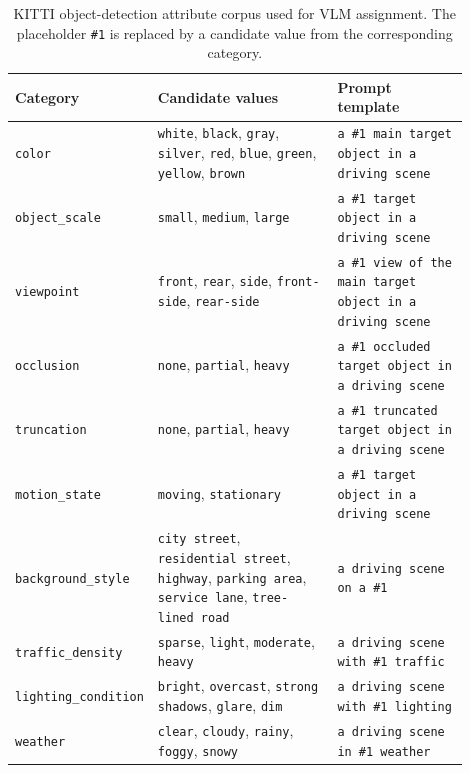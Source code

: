 \documentclass{article}
\begin{document}
\begin{table}[h]
\centering
\caption{KITTI object-detection attribute corpus used for VLM assignment. The placeholder \texttt{\#1} is replaced by a candidate value from the corresponding category.}
\label{tab:kitti-attribute-corpus}
\scriptsize
\setlength{\tabcolsep}{2.5pt}
\renewcommand{\arraystretch}{1.08}
\begin{tabular}{p{0.16\linewidth} p{0.43\linewidth} p{0.31\linewidth}}
\toprule
Category & Candidate values & Prompt template \\
\midrule
\texttt{color} &
\texttt{white}, \texttt{black}, \texttt{gray}, \texttt{silver}, \texttt{red}, \texttt{blue}, \texttt{green}, \texttt{yellow}, \texttt{brown} &
\texttt{a \#1 main target object in a driving scene} \\
\texttt{object\_scale} &
\texttt{small}, \texttt{medium}, \texttt{large} &
\texttt{a \#1 target object in a driving scene} \\
\texttt{viewpoint} &
\texttt{front}, \texttt{rear}, \texttt{side}, \texttt{front-side}, \texttt{rear-side} &
\texttt{a \#1 view of the main target object in a driving scene} \\
\texttt{occlusion} &
\texttt{none}, \texttt{partial}, \texttt{heavy} &
\texttt{a \#1 occluded target object in a driving scene} \\
\texttt{truncation} &
\texttt{none}, \texttt{partial}, \texttt{heavy} &
\texttt{a \#1 truncated target object in a driving scene} \\
\texttt{motion\_state} &
\texttt{moving}, \texttt{stationary} &
\texttt{a \#1 target object in a driving scene} \\
\texttt{background\_style} &
\texttt{city street}, \texttt{residential street}, \texttt{highway}, \texttt{parking area}, \texttt{service lane}, \texttt{tree-lined road} &
\texttt{a driving scene on a \#1} \\
\texttt{traffic\_density} &
\texttt{sparse}, \texttt{light}, \texttt{moderate}, \texttt{heavy} &
\texttt{a driving scene with \#1 traffic} \\
\texttt{lighting\_condition} &
\texttt{bright}, \texttt{overcast}, \texttt{strong shadows}, \texttt{glare}, \texttt{dim} &
\texttt{a driving scene with \#1 lighting} \\
\texttt{weather} &
\texttt{clear}, \texttt{cloudy}, \texttt{rainy}, \texttt{foggy}, \texttt{snowy} &
\texttt{a driving scene in \#1 weather} \\
\bottomrule
\end{tabular}
\end{table}
\end{document}
